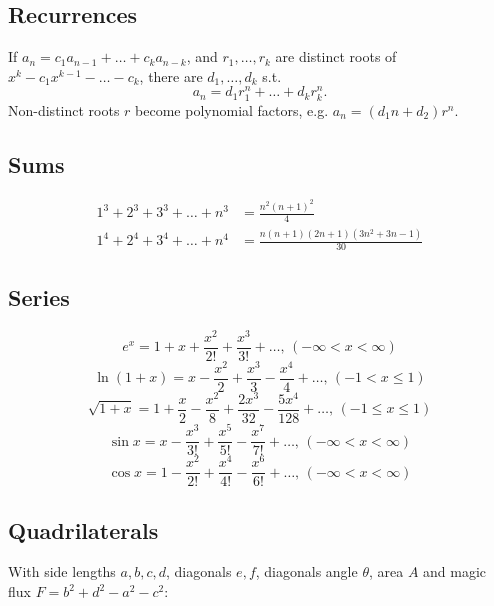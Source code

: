 \documentclass[
	a4paper,
	landscape,
	10pt,
]{article}
\begin{document}
\begin{multicols}{3}

    \subsection{Recurrences}
        If $a_n = c_1 a_{n-1} + \dots + c_k a_{n-k}$, and $r_1, \dots, r_k$ are distinct roots of $x^k - c_1 x^{k-1} - \dots - c_k$, there are $d_1, \dots, d_k$ s.t.
        \[a_n = d_1r_1^n + \dots + d_kr_k^n. \]
        Non-distinct roots $r$ become polynomial factors, e.g. $a_n = (d_1n + d_2)r^n$.

	\subsection{Sums} \vspace{-1cm}
		\begin{align*}
			1^3 + 2^3 + 3^3 + \dots + n^3 &= \frac{n^2(n+1)^2}{4} \\
			1^4 + 2^4 + 3^4 + \dots + n^4 &= \frac{n(n+1)(2n+1)(3n^2 + 3n - 1)}{30}
		\end{align*}
	\subsection{Series} \vspace{-1cm}
		$$e^x = 1+x+\frac{x^2}{2!}+\frac{x^3}{3!}+\dots,\,(-\infty<x<\infty)$$
		$$\ln(1+x) = x-\frac{x^2}{2}+\frac{x^3}{3}-\frac{x^4}{4}+\dots,\,(-1<x\leq1)$$
		$$\sqrt{1+x} = 1+\frac{x}{2}-\frac{x^2}{8}+\frac{2x^3}{32}-\frac{5x^4}{128}+\dots,\,(-1\leq x\leq1)$$
		$$\sin x = x-\frac{x^3}{3!}+\frac{x^5}{5!}-\frac{x^7}{7!}+\dots,\,(-\infty<x<\infty)$$
		$$\cos x = 1-\frac{x^2}{2!}+\frac{x^4}{4!}-\frac{x^6}{6!}+\dots,\,(-\infty<x<\infty)$$

	\subsection{Quadrilaterals}
        With side lengths $a,b,c,d$, diagonals $e, f$, diagonals angle $\theta$, area $A$ and
        magic flux $F=b^2+d^2-a^2-c^2$:
        

\end{multicols}
\end{document}
